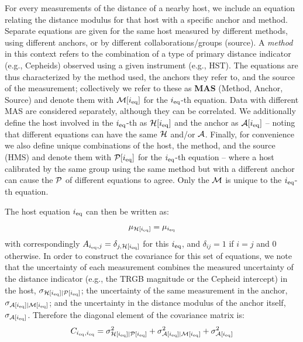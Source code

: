 For every measurements of the distance of a nearby host, we include an equation relating the distance modulus for that host with a specific anchor and method. Separate equations are given for the same host measured by different methods, using different anchors, or by different collaborations/groups (source).  A \textit{method} in this context refers to the combination of a type of primary distance indicator (e.g., Cepheids) observed using a given instrument (e.g., HST). The equations are thus characterized by the method used, the anchors they refer to, and the source of the measurement; collectively we refer to these as \textbf{MAS} (Method, Anchor, Source) and denote them with $\imas[\ieq]$ for the ${i_{\rm eq}}$-th equation.  Data with different MAS are considered separately, although they can be correlated. We additionally define the host involved in the ${i_{\rm eq}}$-th as $\ihost[\ieq]$ and the anchor as $\ianchor [\ieq]$ -- noting that different equations can have the same $\ihost$ and/or $\ianchor$. Finally, for convenience we also define unique combinations of the host, the method, and the source (HMS) and denote them with $\ihms[\ieq]$ for the ${i_{\rm eq}}$-th equation -- where a host calibrated by the same group using the same method but with a different anchor can cause the $\ihms$ of different equations to agree. Only the $\imas$ is unique to the ${i_{\rm eq}}$-th equation.

The host equation ${i_{\rm eq}}$ can then be written as:
\begin {equation}
\mu_{\ihost[\ieq]} = \mu_{\ieq}
\end{equation}
with correspondingly $A_{\ieq,j}=\delta_{j, \ihost[\ieq]}$ for this ${i_{\rm eq}}$, and $\delta_{ij} =1$ if $i=j$ and 0 otherwise.  In order to construct the covariance for this set of equations, we note that the uncertainty of each measurement combines the measured uncertainty of the distance indicator (e.g., the TRGB magnitude or the Cepheid intercept) in the host, $ \sigma_{\ihost[\ieq]| \ihms[\ieq]} $; the uncertainty of the same measurement in the anchor, $ \sigma_{\ianchor[\ieq]| \imas[\ieq]}$; and the uncertainty in the distance modulus of the anchor itself, $ \sigma_{\ianchor[\ieq]} $. Therefore the diagonal element of the covariance matrix is:
\begin {equation}
C_{\ieq, \ieq} = \sigma_{\ihost[\ieq]| \ihms[\ieq]}^2 + \sigma_{\ianchor[\ieq]| \imas[\ieq]}^2 + \sigma_{\ianchor[\ieq]}^2
\end{equation}

